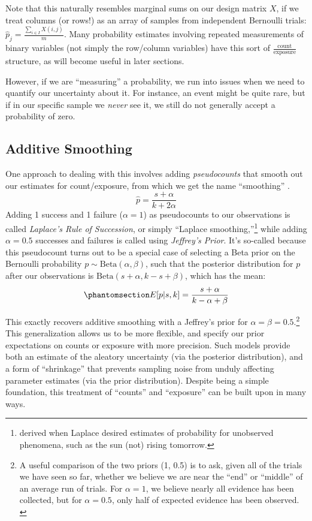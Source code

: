\documentclass[%
	12pt,
		oneside,
		letterpaper
]{book}
\begin{document}
Note that this naturally resembles marginal sums on our design matrix
\(X\), if we treat columns (or rows!) as an array of samples from
independent Bernoulli trials:
\(\hat{p}_j = \frac{\sum_{i\in I} X(i,j)}{m}\). Many probability
estimates involving repeated measurements of binary variables (not
simply the row/column variables) have this sort of
\(\frac{\textrm{count}}{\textrm{exposure}}\) structure, as will become
useful in later sections.

However, if we are ``measuring'' a probability, we run into issues when
we need to quantify our uncertainty about it. For instance, an event
might be quite rare, but if in our specific sample we \emph{never} see
it, we still do not generally accept a probability of zero.

\subsection{Additive Smoothing}\label{sec-counting}

One approach to dealing with this involves adding \emph{pseudocounts}
that smooth out our estimates for count/exposure, from which we get the
name ``smoothing''
\autocite[45-53]{SpeechLanguageProcessing_Jurafsky2025}.
\[\hat{p} = \frac{s+\alpha}{k+2\alpha} \] Adding 1 success and 1 failure
(\(\alpha=1\)) as pseudocounts to our observations is called
\emph{Laplace's Rule of Succession}, or simply ``Laplace
smoothing,''\footnote{ derived when Laplace desired estimates of
  probability for unobserved phenomena, such as the sun (not) rising
  tomorrow.} while adding \(\alpha=0.5\) successes and failures is
called using \emph{Jeffrey's Prior}. It's so-called because this
pseudocount turns out to be a special case of selecting a Beta prior on
the Bernoulli probability \(p\sim \textrm{Beta}(\alpha, \beta)\), such
that the posterior distribution for \(p\) after our observations is
\(\textrm{Beta}(s+\alpha, k-s+\beta)\), which has the mean:
\begin{equation}\phantomsection\label{eq-beta-binomial}{
E[p|s,k]=\frac{s+\alpha}{k-\alpha+\beta}
}\end{equation}

This exactly recovers additive smoothing with a Jeffrey's prior for
\(\alpha=\beta=0.5\).\footnote{ A useful comparison of the two priors
  (1, 0.5) is to ask, given all of the trials we have seen so far,
  whether we believe we are near the ``end'' or ``middle'' of an average
  run of trials. For \(\alpha=1\), we believe nearly all evidence has
  been collected, but for \(\alpha=0.5\), only half of expected evidence
  has been observed.\\
} This generalization allows us to be more flexible, and specify our
prior expectations on counts or exposure with more precision. Such
models provide both an estimate of the aleatory uncertainty (via the
posterior distribution), and a form of ``shrinkage'' that prevents
sampling noise from unduly affecting parameter estimates (via the prior
distribution). Despite being a simple foundation, this treatment of
``counts'' and ``exposure'' can be built upon in many ways.
\end{document}
